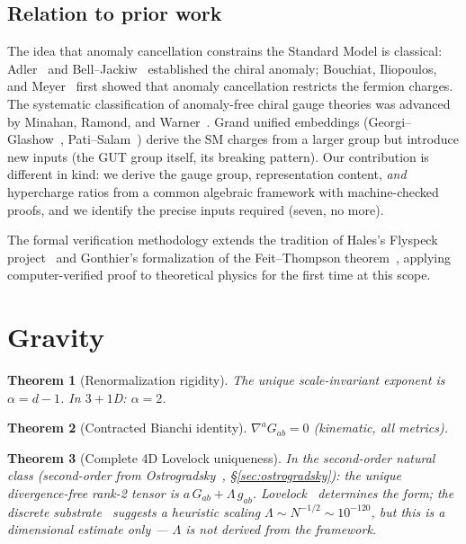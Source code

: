 \documentclass[12pt,a4paper]{article}
\newtheorem{theorem}{Theorem}
\begin{document}
\subsection{Relation to prior work}

The idea that anomaly cancellation constrains the Standard Model is classical: Adler~\cite{adler} and Bell--Jackiw~\cite{belljackiw} established the chiral anomaly; Bouchiat, Iliopoulos, and Meyer~\cite{bim} first showed that anomaly cancellation restricts the fermion charges. The systematic classification of anomaly-free chiral gauge theories was advanced by Minahan, Ramond, and Warner~\cite{mrw}. Grand unified embeddings (Georgi--Glashow~\cite{gg}, Pati--Salam~\cite{patisalam}) derive the SM charges from a larger group but introduce new inputs (the GUT group itself, its breaking pattern). Our contribution is different in kind: we derive the gauge group, representation content, \emph{and} hypercharge ratios from a common algebraic framework with machine-checked proofs, and we identify the precise inputs required (seven, no more).

The formal verification methodology extends the tradition of Hales's Flyspeck project~\cite{flyspeck} and Gonthier's formalization of the Feit--Thompson theorem~\cite{gonthier}, applying computer-verified proof to theoretical physics for the first time at this scope.

\section{Gravity}
\label{sec:gravity}

\begin{theorem}[Renormalization rigidity]
\label{thm:rg}
The unique scale-invariant exponent is $\alpha = d - 1$. In $3{+}1$D: $\alpha = 2$.
\end{theorem}

\begin{theorem}[Contracted Bianchi identity]
\label{thm:bianchi}
$\nabla^a G_{ab} = 0$ (kinematic, all metrics).
\end{theorem}

\begin{theorem}[Complete 4D Lovelock uniqueness]
\label{thm:lovelock}
In the second-order natural class (second-order from Ostrogradsky~\cite{woodard}, \S\ref{sec:ostrogradsky}): the unique divergence-free rank-2 tensor is $a\,G_{ab} + \Lambda\,g_{ab}$. Lovelock~\cite{lovelock} determines the \emph{form}; the discrete substrate~\cite{bombelli,sorkin} suggests a heuristic scaling $\Lambda \sim N^{-1/2} \sim 10^{-120}$, but this is a dimensional estimate only --- $\Lambda$ is \emph{not} derived from the framework.
\end{theorem}
\end{document}
